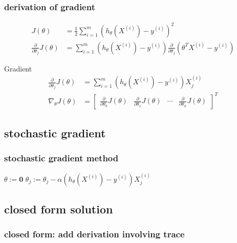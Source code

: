\documentclass[11pt]{beamer}
\begin{document}
\begin{frame}
	\frametitle{derivation of gradient} 
	\begin{align*} 
	 J(\theta) &= \frac{1}{2} \sum_{i=1}^{m} (h_\theta (X^{(i)}) - y^{(i)})^2 \\
	\frac{\partial}{\partial \theta_j} J(\theta) &= \sum_{i=1}^{m} (h_\theta (X^{(i)}) - y^{(i)}) \frac{\partial}{\partial \theta_j} (\theta^T X^{(i)} - y^{(i)})
	\end{align*}
	\begin{block}{Gradient}
	\begin{align*}
	\frac{\partial}{\partial \theta_j} J(\theta) &= \sum_{i=1}^{m} (h_\theta (X^{(i)}) - y^{(i)}) X^{(i)}_j \\ 
	\nabla_\theta J(\theta)  &= 	\begin{bmatrix}
	\frac{\partial}{\partial \theta_0} J(\theta) & \frac{\partial}{\partial \theta_1} J(\theta)  & \cdots & \frac{\partial}{\partial \theta_n} J(\theta) 
								\end{bmatrix}^{T}
	\end{align*}
	\end{block}
\end{frame}

\subsection{stochastic gradient}
\begin{frame}
	\frametitle{stochastic gradient method}
	
\begin{algorithm}[H]
 	\SetAlgoLined
	$\theta := \mathbf{0}$ \;
	 {
		 {
			$\theta_j := \theta_j - \alpha (h_\theta (X^{(i)}) - y^{(i)}) X^{(i)}_j$  \;
		}
	}
 \caption{Stochastic gradient algorithm}
\end{algorithm}
	
\end{frame}

\subsection{closed form solution}
\begin{frame}
	\frametitle{closed form: add derivation involving trace}

\end{frame}
\end{document}
